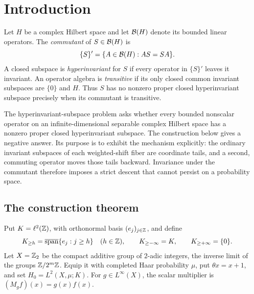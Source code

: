 \section{Introduction}
Let $H$ be a complex Hilbert space and let $\mathcal B(H)$ denote its bounded
linear operators. The \emph{commutant} of $S\in\mathcal B(H)$ is
\[
 \{S\}'=\{A\in\mathcal B(H):AS=SA\}.
\]
A closed subspace is \emph{hyperinvariant} for $S$ if every operator in
$\{S\}'$ leaves it invariant. An operator algebra is \emph{transitive}
if its only closed common invariant subspaces are $\{0\}$ and $H$.
Thus $S$ has no nonzero proper closed hyperinvariant subspace precisely
when its commutant is transitive.

The hyperinvariant-subspace problem asks whether every bounded nonscalar
operator on an infinite-dimensional separable complex Hilbert space has
a nonzero proper closed hyperinvariant subspace. The construction below
gives a negative answer. Its purpose is to exhibit the mechanism
explicitly: the ordinary invariant subspaces of each weighted-shift
fiber are coordinate tails, and a second, commuting operator moves those
tails backward. Invariance under the commutant therefore imposes a
strict descent that cannot persist on a probability space.

\subsection{The construction theorem}
Put $K=\ell^2(\mathbb Z)$, with orthonormal basis $(e_j)_{j\in\mathbb Z}$, and define
\[
 K_{\ge h}=\overline{\operatorname{span}}\{e_j:j\ge h\}
 \quad(h\in\mathbb Z),\qquad
 K_{\ge -\infty}=K,\qquad K_{\ge +\infty}=\{0\}.
\]
Let $X=\mathbb Z_2$ be the compact additive group of $2$-adic integers, the
inverse limit of the groups $\mathbb Z/2^m\mathbb Z$. Equip it with completed Haar
probability $\mu$, put $\theta x=x+1$, and set $H_0=L^2(X,\mu;K)$.
For $g\in L^\infty(X)$, the scalar multiplier is
$(M_gf)(x)=g(x)f(x)$.

